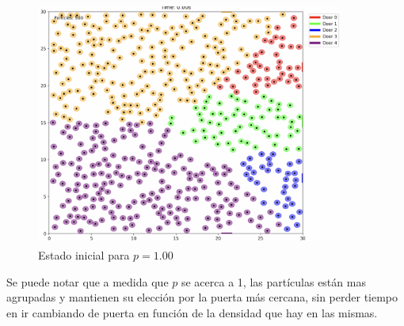 \documentclass[12pt]{article}
\begin{document}
\begin{figure}[H]
\centering
\includegraphics[width=0.9\textwidth]{img/frames/t_20_&_p_1.00.jpg}
\caption{Estado inicial para $p=1.00$}
\label{fig:evac_time_ct}
\end{figure}
Se puede notar que a medida que $p$ se acerca a 1, las partículas están mas agrupadas y mantienen su elección por la puerta más cercana, sin perder tiempo en ir cambiando de puerta en función de la densidad que hay en las mismas.
\end{document}
